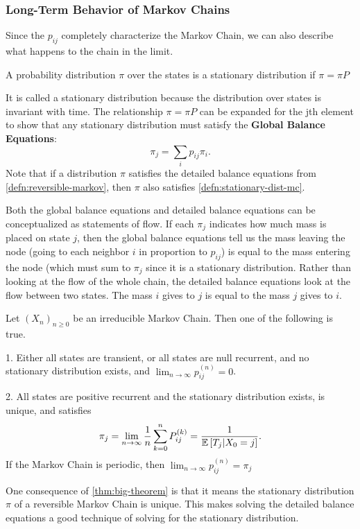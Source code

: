 \subsubsection{Long-Term Behavior of Markov Chains}
Since the $p_{ij}$ completely characterize the Markov Chain, we can also describe what happens to the chain in the limit.
\begin{definition}
	A probability distribution $\pi$ over the states is a stationary distribution if $\pi = \pi P$
	\label{defn:stationary-dist-mc}
\end{definition}
It is called a stationary distribution because the distribution over states is invariant with time.
The relationship $\pi = \pi P$ can be expanded for the jth element to show that any stationary distribution must satisfy the \textbf{Global Balance Equations}:
\[
	\pi_j = \sum_i p_{ij}\pi_i.
\]
Note that if a distribution $\pi$ satisfies the detailed balance equations from \cref{defn:reversible-markov}, then $\pi$ also satisfies \cref{defn:stationary-dist-mc}.

Both the global balance equations and detailed balance equations can be conceptualized as statements of flow.
If each $\pi_j$ indicates how much mass is placed on state $j$, then the global balance equations tell us the mass leaving the node (going to each neighbor $i$ in proportion to $p_{ij}$) is equal to the mass entering the node (which must sum to $\pi_j$ since it is a stationary distribution.
Rather than looking at the flow of the whole chain, the detailed balance equations look at the flow between two states. The mass $i$ gives to $j$ is equal to the mass $j$ gives to $i$.
\begin{theorem}
	Let $(X_n)_{n\geq 0}$ be an irreducible Markov Chain. Then one of the following is true.

	1. Either all states are transient, or all states are null recurrent, and no stationary distribution exists, and $\lim_{n\to\infty}p_{ij}^{(n)} = 0$.
	
	2. All states are positive recurrent and the stationary distribution exists, is unique, and satisfies \[
		\pi_j = \lim_{n\to\infty}\frac{1}{n}\sum_{k=0}^{n}P_{ij}^{(k)} = \frac{1}{\mathbb{E}\left[T_j|X_0=j\right]}.
		\]
		If the Markov Chain is periodic, then $\lim_{n\to\infty}p_{ij}^{(n)} = \pi_j$
	\label{thm:big-theorem}
\end{theorem}
One consequence of \cref{thm:big-theorem} is that it means the stationary distribution $\pi$ of a reversible Markov Chain is unique.
This makes solving the detailed balance equations a good technique of solving for the stationary distribution.
